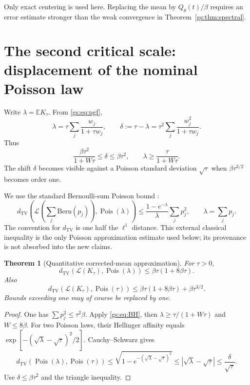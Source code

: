 \documentclass[11pt,a4paper]{article}
\numberwithin{equation}{section}
\newtheorem{theorem}{Theorem}[section]
\theoremstyle{definition}
\theoremstyle{remark}
\newcommand{\Egs}{\mathbb E}
\newcommand{\Pois}{\operatorname{Pois}}
\newcommand{\TV}{d_{\mathrm{TV}}}
\newcommand{\Law}{\mathcal L}
\begin{document}
Only exact centering is used here. Replacing the mean by
$Q_\theta(t)/\beta$ requires an error estimate stronger than the weak
convergence in Theorem~\ref{gs:thm:spectral}.

\section{The second critical scale: displacement of the nominal Poisson law}
\label{gs:sec:poisson}

Write $\lambda=\Egs K_\tau$. From \eqref{gs:eq:pgf},
\begin{equation}\label{gs:eq:lambda-delta}
 \lambda=\tau\sum_j\frac{w_j}{1+\tau w_j},\qquad
 \delta:=\tau-\lambda
 =\tau^2\sum_j\frac{w_j^2}{1+\tau w_j}.
\end{equation}
Thus
\begin{equation}\label{gs:eq:delta-bounds}
 \frac{\beta\tau^2}{1+W\tau}\le\delta\le\beta\tau^2,
 \qquad \lambda\ge\frac{\tau}{1+W\tau}.
\end{equation}
The shift $\delta$ becomes visible against a Poisson standard deviation
$\sqrt\tau$ when $\beta\tau^{3/2}$ becomes order one.

We use the standard Bernoulli-sum Poisson bound
\cite{BarbourHall1984}:
\begin{equation}\label{gs:eq:BH}
 \TV\left(\Law\!\left(\sum_j\mathrm{Bern}(p_j)\right),\Pois(\lambda)\right)
 \le\frac{1-e^{-\lambda}}{\lambda}\sum_jp_j^2,
 \qquad\lambda=\sum_jp_j.
\end{equation}
The convention for $\TV$ is one half the $\ell^1$ distance.
This external classical inequality is the only Poisson approximation
estimate used below; its provenance is not absorbed into the new claims.

\begin{theorem}[Quantitative corrected-mean approximation]\label{gs:thm:corrected-Pois}
For $\tau>0$,
\begin{equation}\label{gs:eq:corrected-bound}
 \TV(\Law(K_\tau),\Pois(\lambda))
 \le\beta\tau(1+8\beta\tau).
\end{equation}
Also
\begin{equation}\label{gs:eq:nominal-bound}
 \TV(\Law(K_\tau),\Pois(\tau))
 \le\beta\tau(1+8\beta\tau)+\beta\tau^{3/2}.
\end{equation}
Bounds exceeding one may of course be replaced by one.
\end{theorem}
\begin{proof}
One has $\sum p_j^2\le\tau^2\beta$. Apply \eqref{gs:eq:BH}, then
$\lambda\ge\tau/(1+W\tau)$ and $W\le8\beta$.
For two Poisson laws, their Hellinger affinity equals
$\exp[-(\sqrt\lambda-\sqrt\tau)^2/2]$. Cauchy--Schwarz gives
\[
 \TV(\Pois(\lambda),\Pois(\tau))
 \le\sqrt{1-e^{-(\sqrt\lambda-\sqrt\tau)^2}}
 \le|\sqrt\lambda-\sqrt\tau|
 \le\frac\delta{\sqrt\tau}.
\]
Use $\delta\le\beta\tau^2$ and the triangle inequality.
\end{proof}
\end{document}

